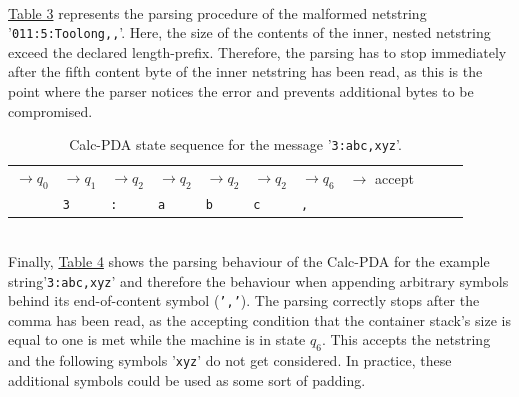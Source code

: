 \\\hyperref[tab:tab3-netstring-3-Calc-pda-state-sequence]{Table 3} represents the parsing procedure of the malformed netstring '\texttt{011:5:Toolong,,}'. Here, the size of the contents of the inner, nested netstring exceed the declared length-prefix. Therefore, the parsing has to stop immediately after the fifth content byte of the inner netstring has been read, as this is the point where the parser notices the error and prevents additional bytes to be compromised.\\
\begin{table}
    \centering
    \begin{tabular}{|lllllllllll|}\hline
         $\rightarrow q_0$ &$\rightarrow q_1$ & $\rightarrow q_2$ & $\rightarrow q_2$ & $\rightarrow q_2$ & $\rightarrow q_2$ & $\rightarrow q_6$ & $\rightarrow$ \tiny{accept} & & &\\
        & \texttt{3} &\texttt{:} &\texttt{a} & \texttt{b} & \texttt{c} & \texttt{,} & & & &\\[10pt]\hline
    \end{tabular}
    \caption{Calc-PDA state sequence for the message '\texttt{3:abc,xyz}'.}
    \label{tab:tab4-netstring-4-Calc-pda-state-sequence}
\end{table}
\\Finally, \hyperref[tab:tab4-netstring-4-Calc-pda-state-sequence]{Table 4} shows the parsing behaviour of the Calc-PDA for the example string'\texttt{3:abc,xyz}' and therefore the behaviour when appending arbitrary symbols behind its end-of-content symbol (\texttt{','}). The parsing correctly stops after the comma has been read, as the accepting condition that the container stack's size is equal to one is met while the machine is in state $q_6$. This accepts the netstring and the following symbols '\texttt{xyz}' do not get considered. In practice, these additional symbols could be used as some sort of padding.

